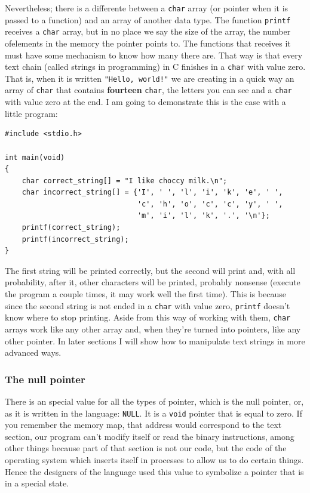 \documentclass[a4paper]{article}
\begin{document}
Nevertheless; there is a differente between a \verb!char! array (or pointer when
it is passed to a function) and an array of another data type. The function
\verb!printf! receives a \verb!char! array, but in no place we say the size
of the array, the number ofelements in the memory the pointer
points to. The functions that receives it must
have some mechanism to know how many there are. That way is that every text
chain (called strings in programming) in C finishes in a \verb!char! with
value zero. That is, when it is written \verb|"Hello, world!"| we are creating
in a quick way an array of \verb!char! that contains \textbf{fourteen}
\verb!char!, the letters you can see and a \verb!char! with value zero at the
end. I am going to demonstrate this is the case with a little program:

\noindent
\begin{minipage}[H]{\linewidth}
\mbox{}
\begin{lstlisting}[style=C, label={lst:sizeofArraysPointers}, caption={Charr array}]
#include <stdio.h>

int main(void)
{
    char correct_string[] = "I like choccy milk.\n";
    char incorrect_string[] = {'I', ' ', 'l', 'i', 'k', 'e', ' ',
                               'c', 'h', 'o', 'c', 'c', 'y', ' ',
                               'm', 'i', 'l', 'k', '.', '\n'};
    printf(correct_string);
    printf(incorrect_string);
}
\end{lstlisting}
\end{minipage}

The first string will be printed correctly, but the second will print and,
with all probability, after it, other characters will be printed, probably
nonsense (execute the program a couple times, it may work well the first time).
This is because since the second string is not ended in a \verb"char" with
value zero, \verb!printf! doesn't know where to stop printing. Aside from
this way of working with them, \verb!char! arrays work like any other array and,
when they're turned into pointers, like any other pointer. In later sections
I will show how to manipulate text strings in more advanced ways.
\subsubsection{The null pointer}
There is an special value for all the types of pointer, which is the null
pointer, or, as it is written in the language: \verb!NULL!. It is a \verb!void!
pointer that is equal to zero. If you remember the memory map, that address
would correspond to the text section, our program can't modify itself or read
the binary instructions, among other things because part of that section is not
our code, but the code of the operating system which inserts itself in processes
to allow us to do certain things. Hence the designers of the language used this
value to symbolize a pointer that is in a special state.
\end{document}
